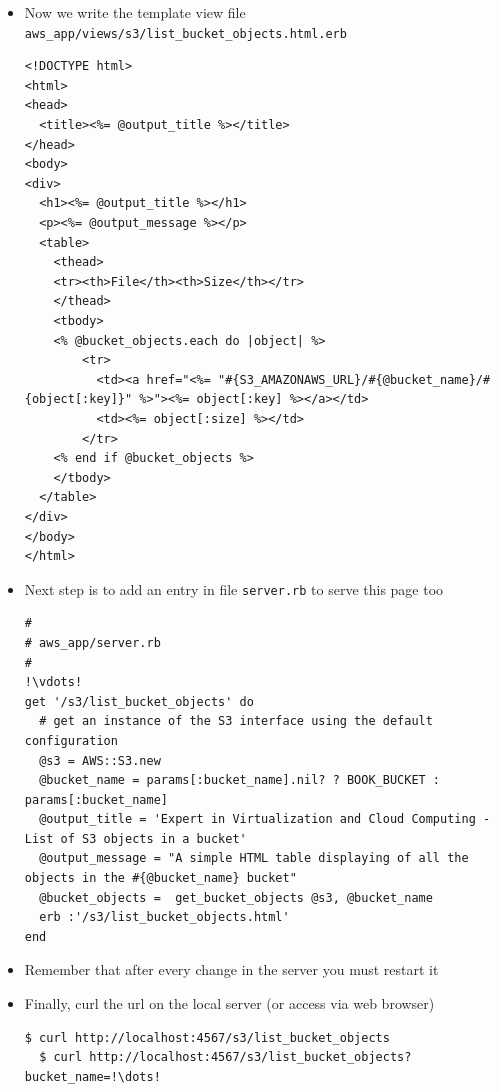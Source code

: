 \documentclass{beamer}
\begin{document}
\begin{frame}
\begin{itemize}
\item Now we write the template view file \texttt{aws\_app/views/s3/list\_bucket\_objects.html.erb}
\lstset{language=Ruby, style=eclipse}
\begin{lstlisting}[escapechar=?]
<!DOCTYPE html>
<html>
<head>
  <title><%= @output_title %></title>
</head>
<body>
<div>
  <h1><%= @output_title %></h1>
  <p><%= @output_message %></p>
  <table>
    <thead>
    <tr><th>File</th><th>Size</th></tr>
    </thead>
    <tbody>
    <% @bucket_objects.each do |object| %>
        <tr>
          <td><a href="<%= "#{S3_AMAZONAWS_URL}/#{@bucket_name}/#{object[:key]}" %>"><%= object[:key] %></a></td>
          <td><%= object[:size] %></td>
        </tr>
    <% end if @bucket_objects %>
    </tbody>
  </table>
</div>
</body>
</html>
\end{lstlisting}

\item Next step is to add an entry in file \texttt{server.rb} to serve this page too
\lstset{language=Ruby, style=eclipse}
\begin{lstlisting}[escapechar=!]
#
# aws_app/server.rb
#
!\vdots!
get '/s3/list_bucket_objects' do
  # get an instance of the S3 interface using the default configuration
  @s3 = AWS::S3.new
  @bucket_name = params[:bucket_name].nil? ? BOOK_BUCKET : params[:bucket_name]
  @output_title = 'Expert in Virtualization and Cloud Computing - List of S3 objects in a bucket'
  @output_message = "A simple HTML table displaying of all the objects in the #{@bucket_name} bucket"
  @bucket_objects =  get_bucket_objects @s3, @bucket_name
  erb :'/s3/list_bucket_objects.html'
end
\end{lstlisting}
\item Remember that after every change in the server you must restart it
\item Finally, curl the url on the local server (or access via web browser)
\lstset{language=shell}
\begin{lstlisting}[escapechar=!]
  $ curl http://localhost:4567/s3/list_bucket_objects
  $ curl http://localhost:4567/s3/list_bucket_objects?bucket_name=!\dots!
\end{lstlisting}

\end{itemize}
\end{frame}
\end{document}

